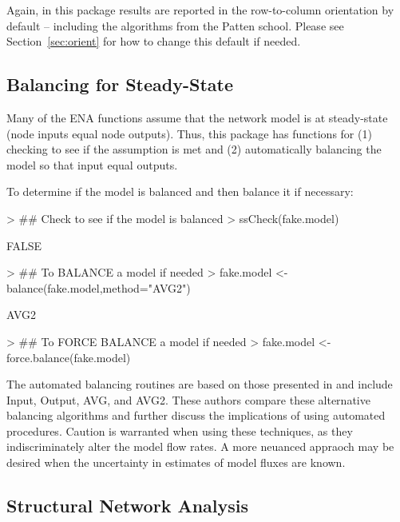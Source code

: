 \documentclass[article]{jss}
\begin{document}
Again, in this package results are reported in the row-to-column
orientation by default -- including the algorithms from the Patten
school.  Please see Section~\ref{sec:orient} for how to change this
default if needed.


\subsection{Balancing for Steady-State}

Many of the ENA functions assume that the network model is at
steady-state (node inputs equal node outputs).  Thus, this package has
functions for (1) checking to see if the assumption is met and (2)
automatically balancing the model so that input equal outputs.

To determine if the model is balanced and then balance it if necessary:

\begin{Schunk}
\begin{Sinput}
> ## Check to see if the model is balanced
> ssCheck(fake.model)
\end{Sinput}
\begin{Soutput}
[1] FALSE
\end{Soutput}
\begin{Sinput}
> ## To BALANCE a model if needed
> fake.model <- balance(fake.model,method="AVG2")
\end{Sinput}
\begin{Soutput}
[1] AVG2
\end{Soutput}
\begin{Sinput}
> ## To FORCE BALANCE a model if needed
> fake.model <- force.balance(fake.model)
\end{Sinput}
\end{Schunk}

The automated balancing routines are based on those presented in
\citet{allesina03} and include Input, Output, AVG, and AVG2.  These authors compare these alternative balancing algorithms and further discuss the implications of using automated
procedures.  Caution is warranted when using these techniques, as they
indiscriminately alter the model flow rates.  A more neuanced appraoch may be desired when the uncertainty in estimates of model fluxes are known.

\subsection{Structural Network Analysis}
\end{document}
